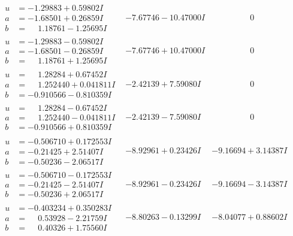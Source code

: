 \documentclass[1p]{elsarticle_modified}
\theoremstyle{definition}
\begin{document}
$$\begin{array}{c|c|c}
\begin{aligned}
u &= -1.29883 + 0.59802 I \\
a &= -1.68501 + 0.26859 I \\
b &= \phantom{-}1.18761 - 1.25695 I\end{aligned}
 & -7.67746 - 10.47000 I & \phantom{-0.000000 } 0 \\ \hline\begin{aligned}
u &= -1.29883 - 0.59802 I \\
a &= -1.68501 - 0.26859 I \\
b &= \phantom{-}1.18761 + 1.25695 I\end{aligned}
 & -7.67746 + 10.47000 I & \phantom{-0.000000 } 0 \\ \hline\begin{aligned}
u &= \phantom{-}1.28284 + 0.67452 I \\
a &= \phantom{-}1.252440 + 0.041811 I \\
b &= -0.910566 - 0.810359 I\end{aligned}
 & -2.42139 + 7.59080 I & \phantom{-0.000000 } 0 \\ \hline\begin{aligned}
u &= \phantom{-}1.28284 - 0.67452 I \\
a &= \phantom{-}1.252440 - 0.041811 I \\
b &= -0.910566 + 0.810359 I\end{aligned}
 & -2.42139 - 7.59080 I & \phantom{-0.000000 } 0 \\ \hline\begin{aligned}
u &= -0.506710 + 0.172553 I \\
a &= -0.21425 + 2.51407 I \\
b &= -0.50236 - 2.06517 I\end{aligned}
 & -8.92961 + 0.23426 I & -9.16694 + 3.14387 I \\ \hline\begin{aligned}
u &= -0.506710 - 0.172553 I \\
a &= -0.21425 - 2.51407 I \\
b &= -0.50236 + 2.06517 I\end{aligned}
 & -8.92961 - 0.23426 I & -9.16694 - 3.14387 I \\ \hline\begin{aligned}
u &= -0.403234 + 0.350283 I \\
a &= \phantom{-}0.53928 - 2.21759 I \\
b &= \phantom{-}0.40326 + 1.75560 I\end{aligned}
 & -8.80263 - 0.13299 I & -8.04077 + 0.88602 I\\

\end{array}$$
\end{document}
